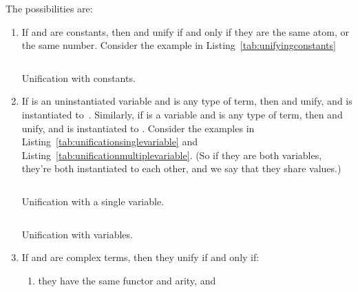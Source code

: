 \documentclass[thesis-solanki.tex]{subfiles}
\begin{document}
The possibilities are:
\begin{enumerate}
\item If  and  are constants, then  and  unify if and only if they
  are the same atom, or the same number. Consider the example in Listing~\ref{tab:unifyingconstants}
\par
\begin{code-list}[H]
\begin{singlespace}
\inputminted{prolog}{prolog-pwp-unify-constants.pl}
\end{singlespace}
\caption{Unification with constants.}
\label{tab:unifyingconstants}
\end{code-list}


\item If  is an uninstantiated variable and  is any type of term, then 
  and  unify, and  is instantiated to \,.
  Similarly, if  is a variable and  is any type of term, then  and 
  unify, and  is instantiated to .
  Consider the examples in Listing~\ref{tab:unificationsinglevariable} and 
  Listing~\ref{tab:unificationmultiplevariable}. (So if they are both 
variables, they're both instantiated to each other, and we say that they share values.)
\par
\begin{code-list}[H]
\begin{singlespace}
\inputminted{prolog}{prolog-pwp-unify-single-variable.pl}
\end{singlespace}
\caption{Unification with a single variable.}
\label{tab:unificationsinglevariable}
\end{code-list}

\begin{code-list}[H]
\begin{singlespace}
\inputminted{prolog}{prolog-pwp-unify-multi-variable.pl}
\end{singlespace}
\caption{Unification with variables.}
\label{tab:unificationmultiplevariable}
\end{code-list}




\item If  and  are complex terms, then they unify if and only if:

\begin{enumerate}
\item they have the same functor and arity, and


\end{enumerate}
\end{enumerate}
\end{document}
